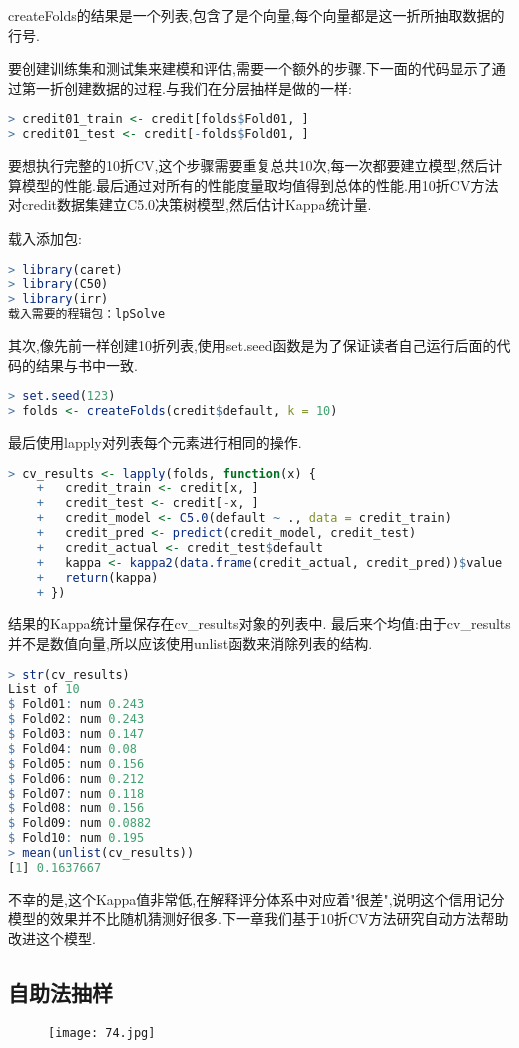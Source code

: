 \documentclass[11pt,a4paper,oneside]{book}
\begin{document}
createFolds的结果是一个列表,包含了是个向量,每个向量都是这一折所抽取数据的行号.

要创建训练集和测试集来建模和评估,需要一个额外的步骤.下一面的代码显示了通过第一折创建数据的过程.与我们在分层抽样是做的一样:

\begin{lstlisting}[language=r]
> credit01_train <- credit[folds$Fold01, ]
> credit01_test <- credit[-folds$Fold01, ]
\end{lstlisting}
要想执行完整的10折CV,这个步骤需要重复总共10次,每一次都要建立模型,然后计算模型的性能.最后通过对所有的性能度量取均值得到总体的性能.用10折CV方法对credit数据集建立C5.0决策树模型,然后估计Kappa统计量.

载入添加包:
\begin{lstlisting}[language=r]
> library(caret)
> library(C50)
> library(irr)
载入需要的程辑包：lpSolve
\end{lstlisting}

其次,像先前一样创建10折列表,使用set.seed函数是为了保证读者自己运行后面的代码的结果与书中一致.
\begin{lstlisting}[language=r]
> set.seed(123)
> folds <- createFolds(credit$default, k = 10)
\end{lstlisting}
最后使用lapply对列表每个元素进行相同的操作.
\begin{lstlisting}[language=r]
> cv_results <- lapply(folds, function(x) {
	+   credit_train <- credit[x, ]
	+   credit_test <- credit[-x, ]
	+   credit_model <- C5.0(default ~ ., data = credit_train)
	+   credit_pred <- predict(credit_model, credit_test)
	+   credit_actual <- credit_test$default
	+   kappa <- kappa2(data.frame(credit_actual, credit_pred))$value
	+   return(kappa)
	+ })
\end{lstlisting}
结果的Kappa统计量保存在cv\_results对象的列表中. 最后来个均值:由于cv\_results并不是数值向量,所以应该使用unlist函数来消除列表的结构.
\begin{lstlisting}[language=r]
> str(cv_results)
List of 10
$ Fold01: num 0.243
$ Fold02: num 0.243
$ Fold03: num 0.147
$ Fold04: num 0.08
$ Fold05: num 0.156
$ Fold06: num 0.212
$ Fold07: num 0.118
$ Fold08: num 0.156
$ Fold09: num 0.0882
$ Fold10: num 0.195
> mean(unlist(cv_results))
[1] 0.1637667
\end{lstlisting}

不幸的是,这个Kappa值非常低,在解释评分体系中对应着"很差",说明这个信用记分模型的效果并不比随机猜测好很多.下一章我们基于10折CV方法研究自动方法帮助改进这个模型.

\subsection{自助法抽样}
\begin{figure}[H]
	\centering
	\texttt{[image: 74.jpg]}
\end{figure}
\end{document}
